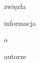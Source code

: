 \documentclass[../MAIN.tex]{subfiles}
\begin{document}
zwięzła

informacja

o

autorze
\end{document}
